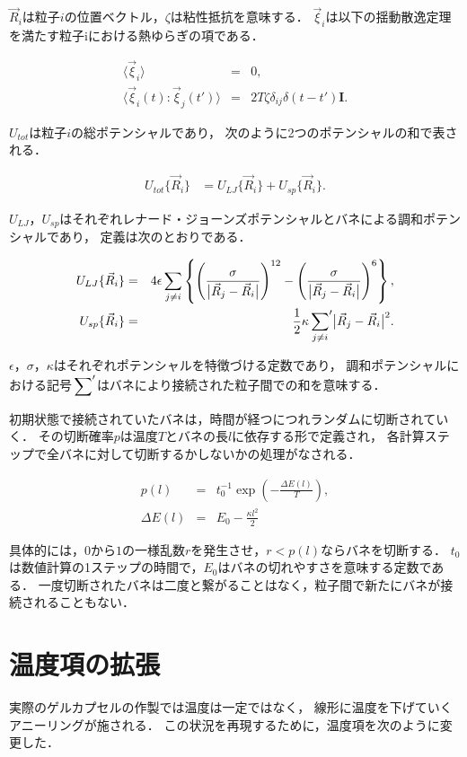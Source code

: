 $\vec{R}_i$は粒子$i$の位置ベクトル，$\zeta$は粘性抵抗を意味する．
$\vec{\xi}_i$は以下の揺動散逸定理を満たす粒子iにおける熱ゆらぎの項である．

\begin{eqnarray}
\label{langevin0}
\langle\vec{\xi}_i\rangle &=& 0, \\
\label{langevin1}
\langle\vec{\xi}_i(t):\vec{\xi}_j(t')\rangle &=& 2T\zeta\delta_{ij}\delta(t-t')\bm{I}.
\end{eqnarray}

$U_{tot}$は粒子$i$の総ポテンシャルであり，
次のように2つのポテンシャルの和で表される．

\begin{eqnarray}
U_{tot}\{\vec{R}_i\}
&=
 U_{LJ}\{\vec{R}_i\}
+U_{sp}\{\vec{R}_i\}.
\end{eqnarray}

$U_{LJ}$，$U_{sp}$はそれぞれレナード・ジョーンズポテンシャルとバネによる調和ポテンシャルであり，
定義は次のとおりである．

\begin{eqnarray}
U_{LJ}\{\vec{R}_i\}
&=&
4\epsilon\sum_{j\neq i}
\left\{
\left(
\frac{\sigma}{\bigl|\vec{R}_j-\vec{R}_i\bigr|}
\right)^{12}
-
\left(
\frac{\sigma}{\bigl|\vec{R}_j-\vec{R}_i\bigr|}
\right)^{6}
\right\},
\\
U_{sp}\{\vec{R}_i\}
&=&
\frac{1}{2}
\kappa
\sideset{}{'}\sum_{j\neq i}
\bigl|\vec{R}_j-\vec{R}_i\bigr|^{2}.
\end{eqnarray}

$\epsilon$，$\sigma$，$\kappa$はそれぞれポテンシャルを特徴づける定数であり，
調和ポテンシャルにおける記号$\sideset{}{'}\sum$はバネにより接続された粒子間での和を意味する．

初期状態で接続されていたバネは，時間が経つにつれランダムに切断されていく．
その切断確率$p$は温度$T$とバネの長$l$に依存する形で定義され，
各計算ステップで全バネに対して切断するかしないかの処理がなされる．

\begin{eqnarray}
p(l)
&=&
t_0^{-1}
\exp\left(-\frac{\Delta E(l)}{T}\right)
,\\
\Delta E(l)
&=&
E_0-\frac{\kappa l^2}{2}
\end{eqnarray}

具体的には，$0$から$1$の一様乱数$r$を発生させ，$r<p(l)$ならバネを切断する．
$t_0$は数値計算の1ステップの時間で，$E_0$はバネの切れやすさを意味する定数である．
一度切断されたバネは二度と繋がることはなく，粒子間で新たにバネが接続されることもない．


\section{温度項の拡張}
実際のゲルカプセルの作製では温度は一定ではなく，
線形に温度を下げていくアニーリングが施される．
この状況を再現するために，温度項を次のように変更した．

